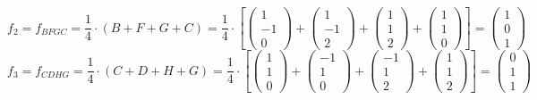 \documentclass{article}
\begin{document}
\[f_2=f_{BFGC}=\frac{1}{4}\cdot(B+F+G+C)=\frac{1}{4}\cdot\left[
\left({\begin{array}{c} 1 \\  -1 \\ 0 \end{array}}\right)+
\left({\begin{array}{c} 1 \\  -1 \\ 2 \end{array}}\right)+
\left({\begin{array}{c} 1 \\  1 \\ 2 \end{array}}\right)+
\left({\begin{array}{c} 1 \\  1 \\ 0 \end{array}}\right)\right]=
\left({\begin{array}{c} 1 \\ 0 \\ 1 \end{array}}\right)
\]
\[f_3=f_{CDHG}=\frac{1}{4}\cdot(C+D+H+G)=\frac{1}{4}\cdot\left[
\left({\begin{array}{c} 1 \\  1 \\ 0 \end{array}}\right)+
\left({\begin{array}{c} -1 \\  1 \\ 0 \end{array}}\right)+
\left({\begin{array}{c} -1 \\  1 \\ 2 \end{array}}\right)+
\left({\begin{array}{c} 1 \\  1 \\ 2 \end{array}}\right)\right]=
\left({\begin{array}{c} 0 \\ 1 \\ 1 \end{array}}\right)
\]
\end{document}
